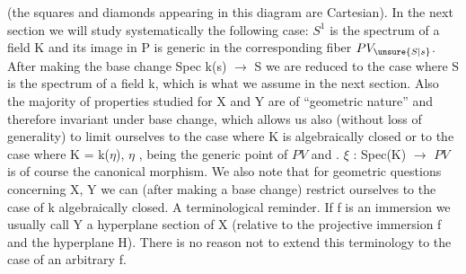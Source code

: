 
(the squares and diamonds appearing in this diagram are
Cartesian). In the next section we will study systematically the
following case: $S^{1}$ is the spectrum of a field K and its image in P
is generic in the corresponding fiber $PV_{\unsure{S|s}}$. After making the base
change Spec k(s) $\rightarrow$ S we are reduced to the case where S is the
spectrum of a field k, which is what we assume in the next
section. Also the majority of properties studied for X and Y are
of ``geometric nature'' and therefore invariant under base change,
which allows us also (without loss of generality) to limit
ourselves to the case where K is algebraically closed or to the
case where K = k($\eta$), $\eta$ , being the generic point of $PV$ and . $\xi$ :
Spec(K) $\rightarrow$ $PV$ is of course the canonical morphism. We also note
that for geometric questions concerning X, Y we can (after making
a base change) restrict ourselves to the case of k algebraically
closed. A terminological reminder. If f is an immersion we
usually call Y a hyperplane section of X (relative to the
projective immersion f and the hyperplane H). There is no reason
not to extend this terminology to the case of an arbitrary f.
